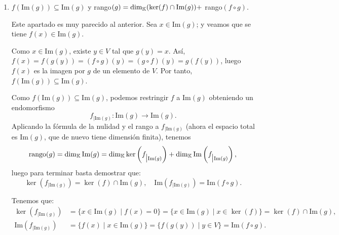 \documentclass[12pt]{article}
\begin{document}
\begin{ejercicio}[2.5 puntos]
\begin{enumerate}
				\item $f(\text{Im}(g)) \subseteq \text{Im}(g)$ y rango$(g) = \dim_{{\mathbb{K}}}( \ker(f) \cap \text{Im}(g)) +$ rango$(f \circ g)$.
				
				Este apartado es muy parecido al anterior. Sea $x \in \text{Im}(g)$; y veamos que se tiene $f(x) \in \text{Im}(g)$. 
				
				Como $x \in \text{Im}(g)$, existe $y \in V$ tal que $g(y) = x$. Así, $f(x) = f(g(y)) = (f \circ g)(y) = (g \circ f)(y) = g(f(y))$, luego $f(x)$ es la imagen por $g$ de un elemento de $V$. Por tanto, 
				$f(\text{Im}(g)) \subseteq \text{Im}(g)$. 
				
				Como $f(\text{Im}(g)) \subseteq \text{Im}(g)$, podemos restringir $f$ a $\text{Im}(g)$ obteniendo un endomorfismo
				$$f_{\big| \text{Im}(g)} : \text{Im}(g) \to \text{Im}(g).$$
				Aplicando la fórmula de la nulidad y el rango a $f_{\big| \text{Im}(g)}$ (ahora el espacio total es $\text{Im}(g)$, que de nuevo tiene dimensión finita), tenemos
				$$ \text{rango}(g) = \dim_{{\mathbb{K}}} \text{Im}(g) = \dim_{{\mathbb{K}}} \ker\left(f_{\big| \text{Im}(g)}\right) + \dim_{{\mathbb{K}}} \text{Im}\left(f_{\big| \text{Im}(g)}\right), $$ 
				luego para terminar basta demostrar que:
				$$ \ker\left(f_{\big| \text{Im}(g)}\right) = \ker(f) \cap \text{Im}(g), \quad \text{Im}\left(f_{\big| \text{Im}(g)}\right) = \text{Im}(f \circ g). $$

				Tenemos que:
				\begin{align*}
					\ker\left(f_{\big| \text{Im}(g)}\right) &= \{ x \in \text{Im}(g) \mid f(x) = 0 \} = \{ x \in \text{Im}(g) \mid x \in \ker(f) \} = \ker(f) \cap \text{Im}(g),
					\\\text{Im}\left(f_{\big| \text{Im}(g)}\right) &= \{ f(x) \mid x \in \text{Im}(g) \} = \{ f(g(y)) \mid y \in V \} = \text{Im}(f \circ g).
				\end{align*}
				
			\end{enumerate}
		\end{ejercicio}
		
\end{document}
